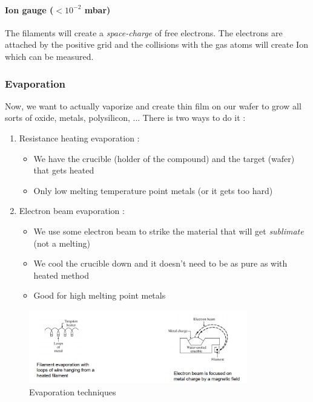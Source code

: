 \documentclass[
]{article}
\begin{document}
\hypertarget{ion-gauge-10-2-mbar}{%
\paragraph{\texorpdfstring{Ion gauge (\(< 10^{-2}\)
mbar)}{Ion gauge (\textless{} 10\^{}\{-2\} mbar)}}\label{ion-gauge-10-2-mbar}}

The filaments will create a \emph{space-charge} of free electrons. The
electrons are attached by the positive grid and the collisions with the
gas atoms will create Ion which can be measured.

\hypertarget{evaporation}{%
\subsubsection{Evaporation}\label{evaporation}}

Now, we want to actually vaporize and create thin film on our wafer to
grow all sorts of oxide, metals, polysilicon, ... There is two ways to
do it :

\begin{enumerate}
\def\labelenumi{\arabic{enumi}.}
\item
  Resistance heating evaporation :

  \begin{itemize}
  \item
    We have the crucible (holder of the compound) and the target (wafer)
    that gets heated
  \item
    Only low melting temperature point metals (or it gets too hard)
  \end{itemize}
\item
  Electron beam evaporation :

  \begin{itemize}
  \item
    We use some electron beam to strike the material that will get
    \emph{sublimate} (not a melting)
  \item
    We cool the crucible down and it doesn't need to be as pure as with
    heated method
  \item
    Good for high melting point metals
  \end{itemize}
\end{enumerate}

\begin{figure}
\hypertarget{fig:evap-label}{%
\centering
\includegraphics[width=0.85\textwidth,height=\textheight]{evaporation_method.png}
\caption{Evaporation techniques}\label{fig:evap-label}
}
\end{figure}
\end{document}

